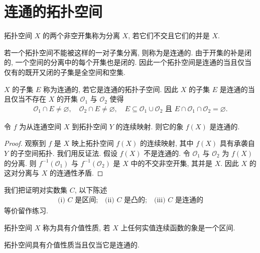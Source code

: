 \documentclass[../../main.tex]{subfiles}
\begin{document}
\section{连通的拓扑空间}\label{section:ch11-连通}

拓扑空间 $X$ 的两个非空开集称为分离 $X$, 若它们不交且它们的并是 $X$.

若一个拓扑空间不能被这样的一对子集分离, 则称为是连通的. 由于开集的补是闭的, 一个空间的分离中的每个开集也是闭的. 因此一个拓扑空间是连通的当且仅当仅有的既开又闭的子集是全空间和空集.

$X$ 的子集 $E$ 称为连通的, 若它是连通的拓扑子空间. 因此 $X$ 的子集 $E$ 是连通的当且仅当不存在 $X$ 的开集 $\mathcal{O}_{1}$ 与 $\mathcal{O}_{2}$ 使得
\begin{align*}
\mathcal{O}_{1}\cap E\neq\varnothing,\quad\mathcal{O}_{2}\cap E\neq\varnothing,\quad E\subseteq\mathcal{O}_{1}\cup\mathcal{O}_{2}\text{ 且 }E\cap\mathcal{O}_{1}\cap\mathcal{O}_{2}=\varnothing.
\end{align*}

\begin{proposition}\label{proposition:ch11-连通连续象}
令 $f$ 为从连通空间 $X$ 到拓扑空间 $Y$ 的连续映射. 则它的象 $f(X)$ 是连通的.
\end{proposition}

\begin{proof}
观察到 $f$ 是 $X$ 映上拓扑空间 $f(X)$ 的连续映射, 其中 $f(X)$ 具有承袭自 $Y$ 的子空间拓扑. 我们用反证法. 假设 $f(X)$ 不是连通的. 令 $\mathcal{O}_{1}$ 与 $\mathcal{O}_{2}$ 为 $f(X)$ 的分离. 则 $f^{-1}(\mathcal{O}_{1})$ 与 $f^{-1}(\mathcal{O}_{2})$ 是 $X$ 中的不交非空开集, 其并是 $X$. 因此 $X$ 的这对分离与 $X$ 的连通性矛盾.
\end{proof}

我们把证明对实数集 $C$, 以下陈述
\begin{align}
\text{(i) }C\text{ 是区间;}\quad\text{(ii) }C\text{ 是凸的;}\quad\text{(iii) }C\text{ 是连通的}\label{align:ch11-连通-1}
\end{align}
等价留作练习.

\begin{definition}[介值性质]\label{definition:ch11-介值性质}
拓扑空间 $X$ 称为具有介值性质, 若 $X$ 上任何实值连续函数的象是一个区间.
\end{definition}

\begin{proposition}\label{proposition:ch11-连通介值}
拓扑空间具有介值性质当且仅当它是连通的.
\end{proposition}
\end{document}
